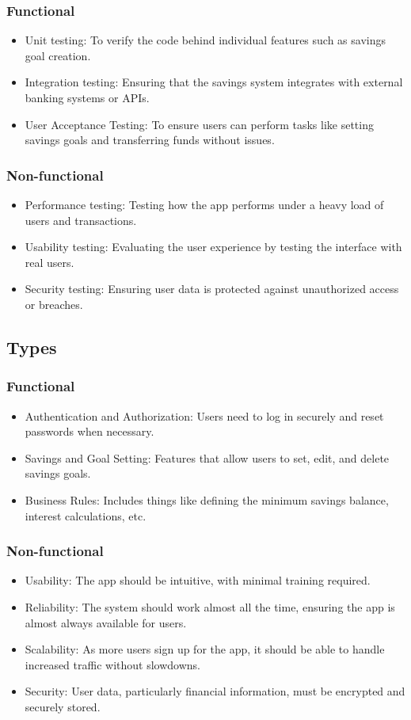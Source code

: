 \documentclass{article}
\begin{document}
\subsubsection{Functional}
\begin{itemize}
    \item Unit testing: To verify the code behind individual features such as savings goal creation.
    \item Integration testing: Ensuring that the savings system integrates with external banking systems or APIs.
    \item User Acceptance Testing: To ensure users can perform tasks like setting savings goals and transferring funds without issues.
\end{itemize}
\subsubsection{Non-functional}
\begin{itemize}
    \item Performance testing: Testing how the app performs under a heavy load of users and transactions.
    \item Usability testing: Evaluating the user experience by testing the interface with real users.
    \item Security testing: Ensuring user data is protected against unauthorized access or breaches.
\end{itemize}

\subsection{Types}
\subsubsection{Functional}
\begin{itemize}
    \item Authentication and Authorization: Users need to log in securely and reset passwords when necessary.
    \item Savings and Goal Setting: Features that allow users to set, edit, and delete savings goals.
    \item Business Rules: Includes things like defining the minimum savings balance, interest calculations, etc.
\end{itemize}
\subsubsection{Non-functional}
\begin{itemize}
    \item Usability: The app should be intuitive, with minimal training required.
    \item Reliability: The system should work almost all the time, ensuring the app is almost always available for users.
    \item Scalability: As more users sign up for the app, it should be able to handle increased traffic without slowdowns.
    \item Security: User data, particularly financial information, must be encrypted and securely stored.
\end{itemize}
\end{document}
